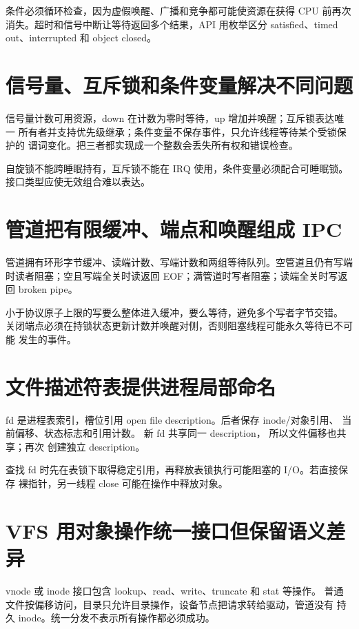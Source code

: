 条件必须循环检查，因为虚假唤醒、广播和竞争都可能使资源在获得 CPU 前再次
消失。超时和信号中断让等待返回多个结果，API 用枚举区分 satisfied、timed
out、interrupted 和 object closed。

\section{信号量、互斥锁和条件变量解决不同问题}

信号量计数可用资源，down 在计数为零时等待，up 增加并唤醒；互斥锁表达唯一
所有者并支持优先级继承；条件变量不保存事件，只允许线程等待某个受锁保护的
谓词变化。把三者都实现成一个整数会丢失所有权和错误检查。

自旋锁不能跨睡眠持有，互斥锁不能在 IRQ 使用，条件变量必须配合可睡眠锁。
接口类型应使无效组合难以表达。

\section{管道把有限缓冲、端点和唤醒组成 IPC}

管道拥有环形字节缓冲、读端计数、写端计数和两组等待队列。空管道且仍有写端
时读者阻塞；空且写端全关时读返回 EOF；满管道时写者阻塞；读端全关时写返回
broken pipe。

小于协议原子上限的写要么整体进入缓冲，要么等待，避免多个写者字节交错。
关闭端点必须在持锁状态更新计数并唤醒对侧，否则阻塞线程可能永久等待已不可能
发生的事件。

\section{文件描述符表提供进程局部命名}

fd 是进程表索引，槽位引用 open file description。后者保存 inode/对象引用、
当前偏移、状态标志和引用计数。 新 fd 共享同一 description，
所以文件偏移也共享；再次  创建独立 description。

查找 fd 时先在表锁下取得稳定引用，再释放表锁执行可能阻塞的 I/O。若直接保存
裸指针，另一线程 close 可能在操作中释放对象。

\section{VFS 用对象操作统一接口但保留语义差异}

vnode 或 inode 接口包含 lookup、read、write、truncate 和 stat 等操作。
普通文件按偏移访问，目录只允许目录操作，设备节点把请求转给驱动，管道没有
持久 inode。统一分发不表示所有操作都必须成功。

